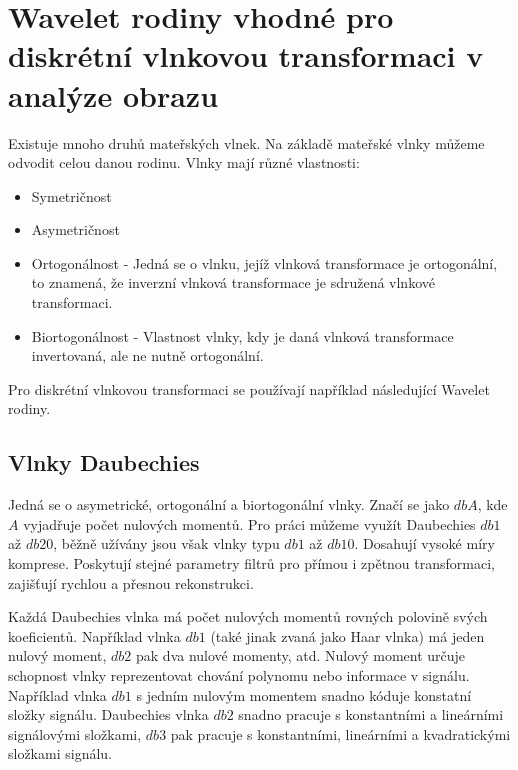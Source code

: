 \section{Wavelet rodiny vhodné pro diskrétní vlnkovou transformaci v analýze obrazu}
Existuje mnoho druhů mateřských vlnek. Na základě mateřské vlnky můžeme odvodit celou danou rodinu. Vlnky mají různé vlastnosti:\cite{PyWaveletsBrowser}
\begin{itemize}
    \item Symetričnost
    \item Asymetričnost
    \item Ortogonálnost - Jedná se o vlnku, jejíž vlnková transformace je ortogonální, to znamená, že inverzní vlnková transformace je sdružená vlnkové transformaci.\cite{WaveletBasics} 
    \item Biortogonálnost - Vlastnost vlnky, kdy je daná vlnková transformace invertovaná, ale ne nutně ortogonální. 
\end{itemize}

Pro diskrétní vlnkovou transformaci se používají například následující Wavelet rodiny.

\subsection{Vlnky Daubechies}

Jedná se o asymetrické, ortogonální a biortogonální vlnky. Značí se jako $dbA$, kde $A$ vyjadřuje počet nulových momentů. Pro práci můžeme využít Daubechies $db1$ až $db20$, běžně užívány jsou však vlnky typu $db1$ až $db10$.\cite{PyWaveletsBrowser} Dosahují vysoké míry komprese. Poskytují stejné parametry filtrů pro přímou i zpětnou transformaci, zajišťují rychlou a přesnou rekonstrukci.\cite{WaveletHlavac} 
    
Každá Daubechies vlnka má počet nulových momentů rovných polovině svých koeficientů. Například vlnka $db1$ (také jinak zvaná jako Haar vlnka) má jeden nulový moment, $db2$ pak dva nulové momenty, atd. Nulový moment určuje schopnost vlnky reprezentovat chování polynomu nebo informace v signálu. Například vlnka $db1$ s jedním nulovým momentem snadno kóduje konstatní složky signálu. Daubechies vlnka $db2$ snadno pracuje s konstantními a lineárními signálovými složkami, $db3$ pak pracuje s konstantními, lineárními a kvadratickými složkami signálu.\cite{WaveletsSignalImageProcessing}

